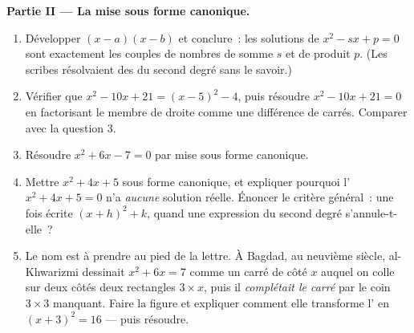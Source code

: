 \begin{problem}[{Devoir du week-end --- problèmes somme-produit,
la mise sous forme canonique telle qu'al-Khwarizmi la dessinait, et
l'équation $x^2 = x + 1$}]
\medskip
\noindent\textbf{Partie II --- La mise sous forme canonique.}
\begin{enumerate}[resume]
  \item Développer $(x - a)(x - b)$ et conclure~: les solutions de
        $x^2 - sx + p = 0$ sont exactement les couples de nombres de
        somme $s$ et de produit $p$. (Les scribes résolvaient des
         du second degré sans le savoir.)
  \item Vérifier que $x^2 - 10x + 21 = (x - 5)^2 - 4$, puis résoudre
        $x^2 - 10x + 21 = 0$ en factorisant le membre de droite comme
        une différence de carrés. Comparer avec la question 3.
  \item Résoudre $x^2 + 6x - 7 = 0$ par mise sous forme canonique.
  \item Mettre $x^2 + 4x + 5$ sous forme canonique, et expliquer
        pourquoi l' $x^2 + 4x + 5 = 0$ n'a \emph{aucune}
        solution réelle. Énoncer le critère général~: une fois écrite
        $(x + h)^2 + k$, quand une expression du second degré
        s'annule-t-elle~?
  \item Le nom est à prendre au pied de la lettre. À Bagdad, au
        neuvième siècle, al-Khwarizmi dessinait $x^2 + 6x = 7$ comme
        un carré de côté $x$ auquel on colle sur deux côtés deux
        rectangles $3 \times x$, puis il \emph{complétait le carré}
        par le coin $3 \times 3$ manquant. Faire la figure et
        expliquer comment elle transforme l' en
        $(x + 3)^2 = 16$ --- puis résoudre.
\end{enumerate}


\end{problem}
